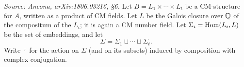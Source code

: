 \begin{definition}
  \label{def:cm-sigma}
  \textit{Source: Ancona, arXiv:1806.03216, §6.}
  Let \(B = L_1 \times \cdots \times L_t\) be a CM-structure for \(A\), written
  as a product of CM fields. Let \(L\) be the Galois closure over \(\mathbb{Q}\) of the
  compositum of the \(L_i\); it is again a CM number field. Let
  \(\Sigma_i = \mathrm{Hom}(L_i, L)\) be the set of embeddings, and let
  \[\Sigma = \Sigma_1 \sqcup \cdots \sqcup \Sigma_t.\]
  Write \(\bar{\cdot}\) for the action on \(\Sigma\) (and on its subsets) induced
  by composition with complex conjugation.
\end{definition}

